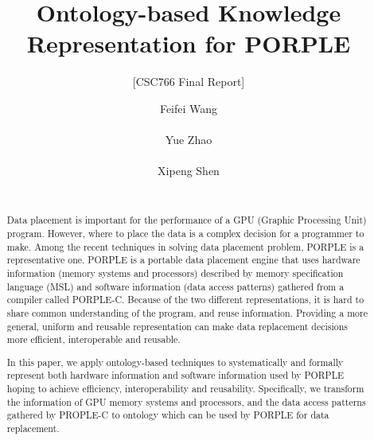 \documentclass{sig-alternate}
\begin{document}

\title{Ontology-based Knowledge Representation for PORPLE}
\subtitle{[CSC766 Final Report]}

\author{
\alignauthor
Feifei Wang\\
       \\
\alignauthor
Yue Zhao\\
       \\
\alignauthor
Xipeng Shen\\
       \\
}
\maketitle
\begin{abstract}
Data placement is important for the performance of a GPU (Graphic Processing Unit) program. However, where to place the data is a complex decision for a programmer to make. Among the recent techniques in solving data placement problem, PORPLE is a representative one. PORPLE is a portable data placement engine that uses hardware information (memory systems and processors) described by memory specification language (MSL) and software information (data access patterns) gathered from a compiler called PORPLE-C. Because of the two different representations, it is hard to share common understanding of the program, and reuse information. Providing a more general, uniform and reusable representation can make data replacement decisions more efficient, interoperable and reusable.

In this paper, we apply ontology-based techniques to systematically and formally represent both hardware information and software information used by PORPLE hoping to achieve efficiency, interoperability and reusability. Specifically, we transform the information of GPU memory systems and processors, and the data access patterns gathered by PROPLE-C to ontology which can be used by PORPLE for data replacement.
 
\end{abstract}


\end{document}
